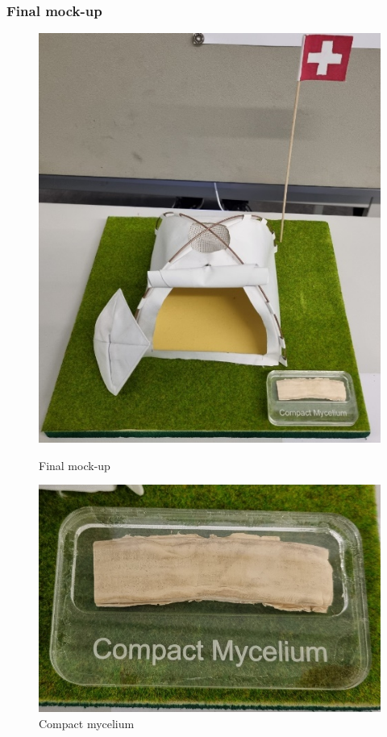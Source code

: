 \documentclass{article}
\begin{document}
\subsubsection{Final mock-up}
\begin{figure}[ht!]
    \centering
    \begin{minipage}{0.45\textwidth}
        \centering
        \includegraphics[width=.8\textwidth]{media/final_mockup.png}
        \caption{Final mock-up}
        \label{fig:final_mockup}
    \end{minipage}%
    \hfill
    \begin{minipage}{0.45\textwidth}
        \centering
        \includegraphics[width=\textwidth]{media/compact_myc.png}
        \caption{Compact mycelium}
        \label{fig:compact_myc}
    \end{minipage}
\end{figure}
\end{document}
